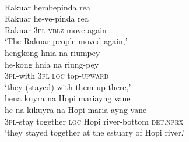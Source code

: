 \ea \label{wooi_narr}
\\
\ea
\glll Rakuar hembepinda rea \\
Rakuar he-ve-pinda rea \\
Rakuar \textsc{3}\textsc{pl}-\textsc{vblz}-move again \\
\glft `The Rakuar people moved again,' \\ 
\ex \label{wooi-kong}
\glll hengkong hnia na riumpey \\
he-kong hnia na riung-pey \\
\textsc{3}\textsc{pl}-with \textsc{3}\textsc{pl} \textsc{loc} top-\textsc{upward} \\
\glft `they (stayed) with them up there,' \\ 
\ex
\glll hena kuyra na Hopi mariayng vane \\ 
he-na kikuyra na Hopi maria-ayng vane \\
\textsc{3}\textsc{pl}-stay together \textsc{loc} Hopi river-bottom \textsc{det}.\textsc{nprx} \\
\glft `they stayed together at the estuary of Hopi river.'\\ 
\z
\z

